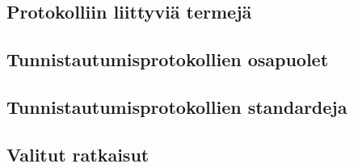 
\subsection{Protokolliin liittyviä termejä}

\subsection{Tunnistautumisprotokollien osapuolet}

\subsection{Tunnistautumisprotokollien standardeja}

\subsection{Valitut ratkaisut}
